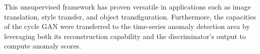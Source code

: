 This unsupervised framework has proven versatile in applications such as image translation, style transfer, and object transfiguration. Furthermore, the capacities of the cycle GAN were transferred to the time-series anomaly detection area \cite{geiger2020tadgan} by leveraging both its reconstruction capability and the discriminator's output to compute anomaly scores.
